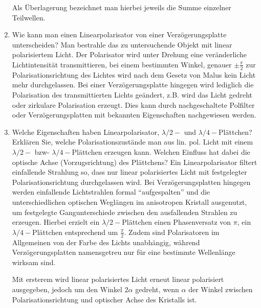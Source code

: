 \begin{enumerate}
		Als Überlagerung bezeichnet man hierbei jeweils die Summe einzelner Teilwellen.
	\item Wie kann man einen Linearpolarisator von einer Verzögerungsplatte unterscheiden?
		\subitem Man bestrahle das zu untersuchende Objekt mit linear polarisiertem Licht. Der Polarisator wird unter Drehung eine veränderliche Lichtintensität transmittieren, bei einem bestimmten Winkel, genauer $\pm\frac{\pi}{2}$ zur Polarisationsrichtung des Lichtes wird nach dem Gesetz von Malus kein Licht mehr durchgelassen. Bei einer Verzögerungsplatte hingegen wird lediglich die Polarisation des transmittierten Lichts geändert, z.B. wird das Licht gedreht oder zirkulare Polarisation erzeugt. Dies kann durch nachgeschaltete Polfilter oder Verzögerungsplatten mit bekannten Eigenschaften nachgewiesen werden.
	\item Welche Eigenschaften haben Linearpolarisator, $\lambda/2-$ und $\lambda/4-$Plättchen? Erklären Sie, welche Polarisationszustände man aus lin. pol. Licht mit einem $\lambda/2-$ bzw- $\lambda/4-$Plättchen erzeugen kann. Welchen Einfluss hat dabei die optische Achse (Vorzugsrichtung) des Plättchens?
		\subitem Ein Linearpolarisator filtert einfallende Strahlung so, dass nur linear polarisiertes Licht mit festgelegter Polarisationsrichtung durchgelassen wird. Bei Verzögerungsplatten hingegen werden einfallende Lichtstrahlen formal "`aufgespalten"' und die unterschiedlichen optischen Weglängen im anisotropen Kristall ausgenutzt, um festgelegte Gangunterschiede zwischen den ausfallenden Strahlen zu erzeugen. Hierbei erzielt ein $\lambda/2-$Plättchen einen Phasenversatz von $\pi$, ein $\lambda/4-$Plättchen entsprechend um $\frac{\pi}{2}$. Zudem sind Polarisatoren im Allgemeinen von der Farbe des Lichts unabhängig, während Verzögerungsplatten namensgetreu nur für eine bestimmte Wellenlänge wirksam sind.
		
		Mit ersterem wird linear polarisiertes Licht erneut linear polarisiert ausgegeben, jedoch um den Winkel $2\alpha$ gedreht, wenn $\alpha$ der Winkel zwischen Polarisationsrichtung und optischer Achse des Kristalls ist.
		

\end{enumerate}

